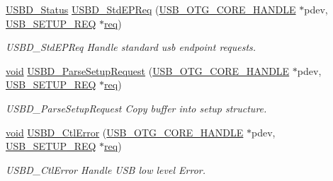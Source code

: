\begin{DoxyCompactItemize}
\hyperlink{group___u_s_b_d___c_o_r_e___exported___defines_ga1c59ec10075b576176aa51c9ef4e9fc4}{U\-S\-B\-D\-\_\-\-Status} \hyperlink{group___u_s_b_d___r_e_q___private___functions_gac02b5937b99e4f75a68427e5f12e12ea}{U\-S\-B\-D\-\_\-\-Std\-E\-P\-Req} (\hyperlink{group___u_s_b___c_o_r_e___exported___types_gaf76054c11eb8a3367907aad7ae700e80}{U\-S\-B\-\_\-\-O\-T\-G\-\_\-\-C\-O\-R\-E\-\_\-\-H\-A\-N\-D\-L\-E} $\ast$pdev, \hyperlink{group___u_s_b___c_o_r_e___exported___types_gacd8d898c844c3657315c7d7a4ea3a99c}{U\-S\-B\-\_\-\-S\-E\-T\-U\-P\-\_\-\-R\-E\-Q} $\ast$\hyperlink{pios__opahrs__proto_8h_ad651fd9affe5ed0ac9abccd8e2791a2c}{req})
\begin{DoxyCompactList}\small\item\em U\-S\-B\-D\-\_\-\-Std\-E\-P\-Req Handle standard usb endpoint requests. \end{DoxyCompactList}\item 
\hyperlink{group___n_a_m_e_ga18028b8badbf1ea7e704ccac3c488e82}{void} \hyperlink{group___u_s_b_d___r_e_q___private___functions_gae533f652d3e81d8fc5e2bedc41659f7d}{U\-S\-B\-D\-\_\-\-Parse\-Setup\-Request} (\hyperlink{group___u_s_b___c_o_r_e___exported___types_gaf76054c11eb8a3367907aad7ae700e80}{U\-S\-B\-\_\-\-O\-T\-G\-\_\-\-C\-O\-R\-E\-\_\-\-H\-A\-N\-D\-L\-E} $\ast$pdev, \hyperlink{group___u_s_b___c_o_r_e___exported___types_gacd8d898c844c3657315c7d7a4ea3a99c}{U\-S\-B\-\_\-\-S\-E\-T\-U\-P\-\_\-\-R\-E\-Q} $\ast$\hyperlink{pios__opahrs__proto_8h_ad651fd9affe5ed0ac9abccd8e2791a2c}{req})
\begin{DoxyCompactList}\small\item\em U\-S\-B\-D\-\_\-\-Parse\-Setup\-Request Copy buffer into setup structure. \end{DoxyCompactList}\item 
\hyperlink{group___n_a_m_e_ga18028b8badbf1ea7e704ccac3c488e82}{void} \hyperlink{group___u_s_b_d___r_e_q___private___functions_gac32cb444f3552aae822169540e7c6986}{U\-S\-B\-D\-\_\-\-Ctl\-Error} (\hyperlink{group___u_s_b___c_o_r_e___exported___types_gaf76054c11eb8a3367907aad7ae700e80}{U\-S\-B\-\_\-\-O\-T\-G\-\_\-\-C\-O\-R\-E\-\_\-\-H\-A\-N\-D\-L\-E} $\ast$pdev, \hyperlink{group___u_s_b___c_o_r_e___exported___types_gacd8d898c844c3657315c7d7a4ea3a99c}{U\-S\-B\-\_\-\-S\-E\-T\-U\-P\-\_\-\-R\-E\-Q} $\ast$\hyperlink{pios__opahrs__proto_8h_ad651fd9affe5ed0ac9abccd8e2791a2c}{req})
\begin{DoxyCompactList}\small\item\em U\-S\-B\-D\-\_\-\-Ctl\-Error Handle U\-S\-B low level Error. \end{DoxyCompactList}\item 

\end{DoxyCompactItemize}
